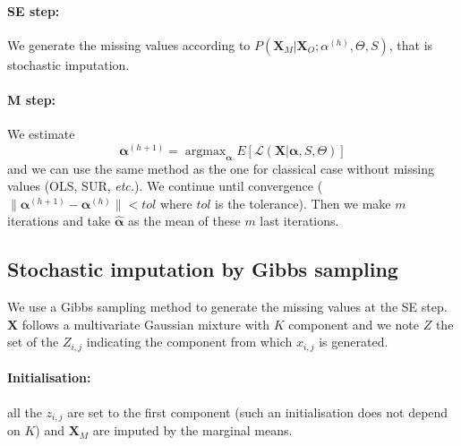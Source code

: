 \documentclass[12pt,a4paper]{report}
\begin{document}
	\paragraph{SE step:}
		We generate the missing values according to $P(\boldsymbol{X}_M|\boldsymbol{X}_O; \alpha^{(h)},\Theta,S)$, that is stochastic imputation.
	\paragraph{M step:}
		We estimate 
		\begin{equation}
	\boldsymbol{\alpha}^{(h+1)}=\operatorname{argmax}_{\boldsymbol{\alpha}}E\left[\mathcal{L}(\boldsymbol{X}|\boldsymbol{\alpha},S,\Theta) \right]
\end{equation}
and we can use the same method as the one for classical case without missing values (OLS, SUR, {\it etc.}).
		We continue until convergence ($\parallel \boldsymbol{\alpha}^{(h+1)} - \boldsymbol{\alpha}^{(h)}\parallel < tol $ where $tol$ is the tolerance). Then we make $m$ iterations and take $\hat{\boldsymbol{\alpha}}$ as the mean of these $m$ last iterations.
		
	\subsection{Stochastic imputation by Gibbs sampling}
		We use a Gibbs sampling method to generate the missing values at the SE step. $\boldsymbol{X}$ follows a multivariate Gaussian mixture with $K$ component and we note $Z$ the set of the $Z_{i,j}$ indicating the component from which $x_{i,j}$ is generated.
		\paragraph{Initialisation:} all the $z_{i,j}$ are set to the first component (such an initialisation does not depend on $K$) and $\boldsymbol{X}_M$ are imputed by the marginal means.
\end{document}
